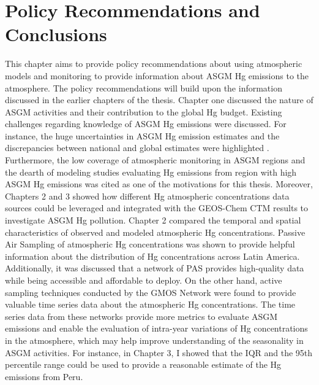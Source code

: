 
\chapter{Policy Recommendations and Conclusions}
\begin{flushleft}
    

This chapter aims to provide policy recommendations about using atmospheric models and monitoring to provide information about ASGM Hg emissions to the atmosphere. The policy recommendations will build upon the information discussed in the earlier chapters of the thesis. Chapter one discussed the nature of ASGM activities and their contribution to the global Hg budget. Existing challenges regarding knowledge of ASGM Hg emissions were discussed. For instance, the huge uncertainties in ASGM Hg emission estimates and the discrepancies between national and global estimates were highlighted \cite{united_nations_environment_programme_technical_2019,agc_reporte_2017}. Furthermore, the low coverage of atmospheric monitoring in ASGM regions and the dearth of modeling studies evaluating Hg emissions from region with high ASGM Hg emissions was cited as one of the motivations for this thesis. Moreover, Chapters 2 and 3 showed how different Hg atmospheric concentrations data sources could be leveraged and integrated with the GEOS-Chem CTM results to investigate ASGM Hg pollution. Chapter 2 compared the temporal and spatial characteristics of observed and modeled atmospheric Hg concentrations. Passive Air Sampling of atmospheric Hg concentrations was shown to provide helpful information about the distribution of Hg concentrations across Latin America. Additionally, it was discussed that a network of PAS provides high-quality data while being accessible and affordable to deploy\cite{quant_measuring_2021}.  On the other hand, active sampling techniques conducted by the GMOS Network were found to provide valuable time series data about the atmospheric Hg concentrations. The time series data from these networks provide more metrics to evaluate ASGM emissions and enable the evaluation of intra-year variations of Hg concentrations in the atmosphere, which may help improve understanding of the seasonality in ASGM activities. For instance, in Chapter 3, I showed that the IQR and the 95th percentile range could be used to provide a reasonable estimate of the Hg emissions from Peru. 
\end{flushleft}
